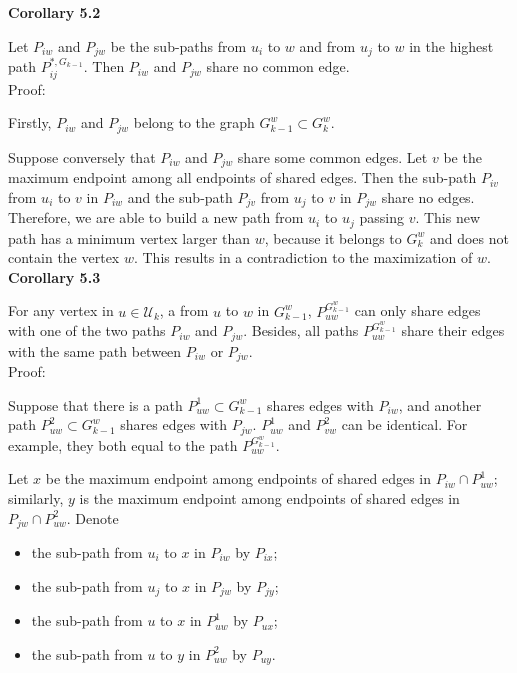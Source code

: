 \documentclass[a4paper,12pt]{article}
\numberwithin{equation}{section}
\begin{document}
	\noindent \textbf{Corollary 5.2}
	
	Let $P_{iw}$ and $P_{jw}$ be the sub-paths from $u_i$ to $w$ and from $u_j$ to $w$ in the highest path $P_{ij}^{*,G_{k-1}}$. Then $P_{iw}$ and $P_{jw}$ share no common edge.\\
	
	\noindent Proof:
	
	Firstly, $P_{iw}$ and $P_{jw}$ belong to the graph $G_{k-1}^w \subset G_{k}^w$.
	
	Suppose conversely that $P_{iw}$ and $P_{jw}$ share some common edges. Let $v$ be the maximum endpoint among all endpoints of shared edges. Then the sub-path $P_{iv}$ from $u_i$ to $v$ in $P_{iw}$ and the sub-path $P_{jv}$ from $u_j$ to $v$ in $P_{jw}$ share no edges. Therefore, we are able to build a new path from $u_i$ to $u_j$ passing $v$. This new path has a minimum vertex larger than $w$, because it belongs to $G^w_k$ and does not contain the vertex $w$. This results in a contradiction to the maximization of $w$.\\
	
	\noindent \textbf{Corollary 5.3}
	
	For any vertex in $u \in \mathcal{U}_k$, a from $u$ to $w$ in $G_{k-1}^w$, $P_{uw}^{G_{k-1}^w}$ can only share edges with one of the two paths $P_{iw}$ and $P_{jw}$. Besides, all paths $P_{uw}^{G_{k-1}^w}$ share their edges with the same path between $P_{iw}$ or $P_{jw}$.\\	
	
	\noindent Proof: 
	
	Suppose that there is a path $P^1_{uw} \subset G_{k-1}^w$ shares edges with $P_{iw}$, and another path $P_{uw}^2 \subset G_{k-1}^w$ shares edges with $P_{jw}$.
	$P^1_{uw}$ and $P^2_{vw}$ can be identical. For example, they both equal to the path $P_{uw}^{G_{k-1}^w}$.
	
	Let $x$ be the maximum endpoint among endpoints of shared edges in $P_{iw} \cap P^1_{uw}$; similarly, $y$ is the maximum endpoint among endpoints of shared edges in $P_{jw} \cap P^2_{uw}$. Denote 
	\begin{itemize}
		\item the sub-path from $u_i$ to $x$ in $P_{iw}$ by $P_{ix}$;
		\item the sub-path from $u_j$ to $x$ in $P_{jw}$ by $P_{jy}$;
		\item the sub-path from $u$ to $x$ in $P^1_{uw}$ by $P_{ux}$;
		\item the sub-path from $u$ to $y$ in $P^2_{uw}$ by $P_{uy}$.
	\end{itemize}
	
\end{document}
